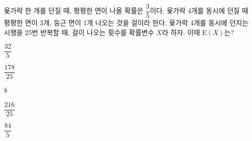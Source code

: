 윷가락 한 개를 던질 때, 평평한 면이 나올 확률은 $\dfrac{3}{5}$이다. 윷가락 4개를 동시에 던질 때 평평한 면이 3개, 둥근 면이 1개 나오는 것을 걸이라 한다. 윷가락 4개를 동시에 던지는 시행을 25번 반복할 때, 걸이 나오는 횟수를 확률변수 $X$라 하자. 이때 $\mathrm{E}(X)$는?
\begin{choices32}{\rule[-3ex]{0pt}{8ex}$\dfrac{32}{5}$}{\rule[-3ex]{0pt}{8ex}$\dfrac{178}{25}$}{\rule[-3ex]{0pt}{8ex}$8$}{\rule[-3ex]{0pt}{8ex}$\dfrac{216}{25}$}{\rule[-3ex]{0pt}{8ex}$\dfrac{84}{5}$}\end{choices32}
